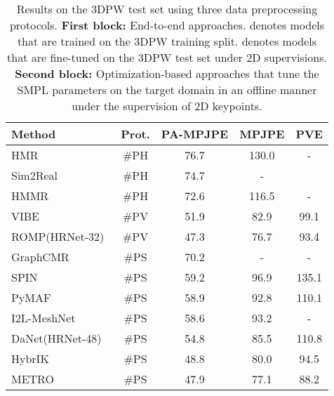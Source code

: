 \documentclass[10pt,journal,compsoc]{IEEEtran}
\let\MYoriglatexcaption\caption
\renewcommand{\caption}[2][\relax]{\MYoriglatexcaption[#2]{#2}}
\begin{document}
\begin{table}[t]
\centering
\caption{Results on the 3DPW test set using three data preprocessing protocols. \textbf{First block:} End-to-end approaches.  denotes models that are trained on the 3DPW training split.  denotes models that are fine-tuned on the 3DPW test set under 2D supervisions. \textbf{Second block:} Optimization-based approaches that tune the SMPL parameters on the target domain in an offline manner under the supervision of 2D keypoints.
}
\vspace{-5pt}
\begin{tabular}{lcccc}
    \toprule 
        Method                                               &Prot.         &PA-MPJPE &MPJPE &PVE    \\
    \midrule
        HMR~\cite{kanazawa2018end}                              &\#PH       &76.7                   &130.0 &-  \\
        Sim2Real~\cite{DBLP:conf/nips/DoerschZ19}               &\#PH       &74.7                   &-      \\
        HMMR~\cite{DBLP:conf/cvpr/KanazawaZFM19}                &\#PH       &72.6                   &116.5  &- \\
        VIBE~\cite{kocabas2020vibe}                       &\#PV       &51.9                   &82.9   & 99.1\\
        ROMP(HRNet-32)~\cite{sun2020monocular}            &\#PV       &47.3                   &76.7 &93.4 \\
        GraphCMR~\cite{kolotouros2019convolutional}             &\#PS       &70.2                   &-  &-    \\
SPIN~\cite{kolotouros2019learning}                      &\#PS       &59.2                   &96.9 &135.1   \\
        PyMAF~\cite{pymaf2021}                                  &\#PS       &58.9                   &92.8 &110.1  \\
        I2L-MeshNet~\cite{Moon_2020_ECCV_I2L-MeshNet}           &\#PS       &58.6                   &93.2  &- \\
        DaNet(HRNet-48)~\cite{zhang2020learning}                &\#PS       &54.8                   &85.5   &110.8\\
        HybrIK~\cite{li2021hybrik}                              &\#PS       &48.8                   &80.0 &94.5 \\
        METRO~\cite{lin2021end}                           &\#PS       &47.9                   &77.1  &88.2 \\

\end{tabular}
\end{table}
\end{document}
